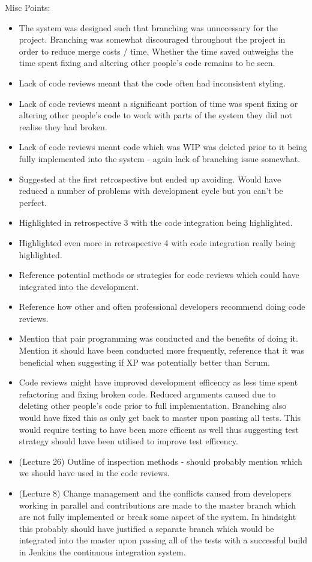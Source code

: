 \documentclass{l3proj}
\begin{document}
Misc Points:
\begin{itemize}
\item The system was designed such that branching was unnecessary for the project. Branching was somewhat discouraged throughout the project in order to reduce merge costs / time. Whether the time saved outweighs the time spent fixing and altering other people’s code remains to be seen.
\item Lack of code reviews meant that the code often had inconsistent styling.
\item Lack of code reviews meant a significant portion of time was spent fixing or altering other people's code to work with parts of the system they did not realise they had broken.
\item Lack of code reviews meant code which was WIP was deleted prior to it being fully implemented into the system - again lack of branching issue somewhat.
\item Suggested at the first retrospective but ended up avoiding. Would have reduced a number of problems with development cycle but you can't be perfect.
\item Highlighted in retrospective 3 with the code integration being highlighted.
\item Highlighted even more in retrospective 4 with code integration really being highlighted.
\item Reference potential methods or strategies for code reviews which could have integrated into the development.
\item Reference how other and often professional developers recommend doing code reviews.
\item Mention that pair programming was conducted and the benefits of doing it. Mention it should have been conducted more frequently, reference that it was beneficial when suggesting if XP was potentially better than Scrum.
\item Code reviews might have improved development efficency as less time spent refactoring and fixing broken code. Reduced arguments caused due to deleting other people's code prior to full implementation. Branching also would have fixed this as only get back to master upon passing all tests. This would require testing to have been more efficent as well thus suggesting test strategy should have been utilised to improve test efficency.
\item (Lecture 26) Outline of inspection methods - should probably mention which we should have used in the code reviews.
\item (Lecture 8) Change management and the conflicts caused from developers working in parallel and contributions are made to the master branch which are not fully implemented or break some aspect of the system. In hindsight this probably should have justified a separate branch which would be integrated into the master upon passing all of the tests with a successful build in Jenkins the continuous integration system.

\end{itemize}
\end{document}
